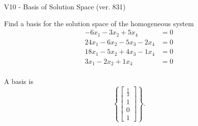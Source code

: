 \begin{exercise}
  \begin{exerciseTitle}V10 - Basis of Solution Space (ver. 831)\end{exerciseTitle}
  \begin{exerciseStatement}
    Find a basis for the solution space of the homogeneous system 
\begin{align*}
 -6 x_ 1 -3 x_ 2 + 5 x_ 4 &= 0  \\ 
  24 x_ 1 -6 x_ 2 -5 x_ 3 -2 x_ 4 &= 0  \\ 
  18 x_ 1 -5 x_ 2 + 4 x_ 3 -1 x_ 4 &= 0  \\ 
  3 x_ 1 -2 x_ 2 + 1 x_ 4 &= 0  \\ 
 \end{align*}


 
  \end{exerciseStatement}

  \begin{exerciseAnswer}
   A basis is   
\[\left\{\left[\begin{array}{c}
\frac{1}{3} \\
1 \\
0 \\
1
\end{array}\right]\right\}.\]

  


  \end{exerciseAnswer}
\end{exercise}